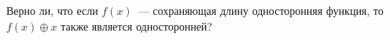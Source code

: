 Верно ли, что если $f(x)$~--- сохраняющая длину односторонняя функция, то $f(x) \oplus x$ также является
односторонней?

